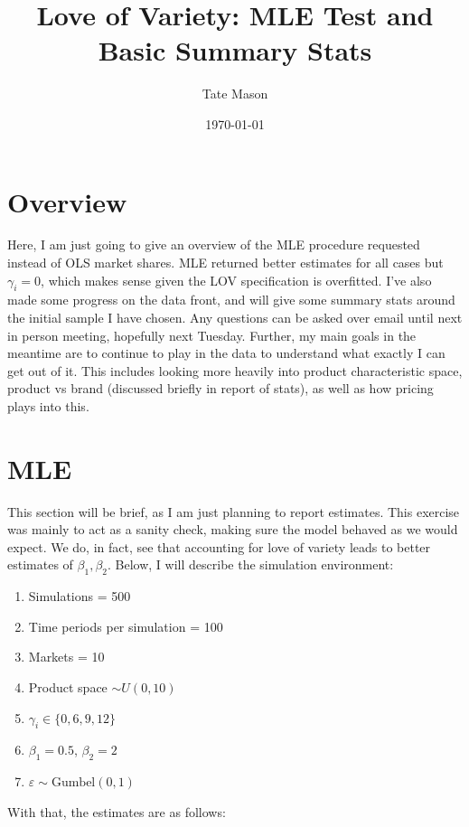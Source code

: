 \documentclass[11pt]{article}
\title{Love of Variety: MLE Test and Basic Summary Stats}
\author{Tate Mason}
\date{\today}
\theoremstyle{definition}
\theoremstyle{remark}
\begin{document}
\maketitle
\thispagestyle{empty}

\section{Overview}

Here, I am just going to give an overview of the MLE procedure requested instead of OLS market shares. MLE returned better estimates for all cases but $\gamma_i=0$, which makes sense given the LOV specification is overfitted. I've also made some progress on the data front, and will give some summary stats around the initial sample I have chosen. Any questions can be asked over email until next in person meeting, hopefully next Tuesday. Further, my main goals in the meantime are to continue to play in the data to understand what exactly I can get out of it. This includes looking more heavily into product characteristic space, product vs brand (discussed briefly in report of stats), as well as how pricing plays into this.

\section{MLE}

This section will be brief, as I am just planning to report estimates. This exercise was mainly to act as a sanity check, making sure the model behaved as we would expect. We do, in fact, see that accounting for love of variety leads to better estimates of $\beta_1, \beta_2$. Below, I will describe the simulation environment:
  \begin{enumerate}
    \item Simulations = 500
    \item Time periods per simulation = 100
    \item Markets = 10
    \item Product space $\sim U(0,10)$
    \item $\gamma_i \in \{0, 6, 9, 12\}$
    \item $\beta_1 = 0.5$, $\beta_2 = 2$
    \item $\varepsilon\sim\text{Gumbel}(0,1)$
  \end{enumerate}

With that, the estimates are as follows:
\end{document}
